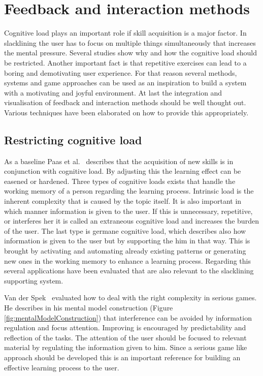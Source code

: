 \section{Feedback and interaction methods}\label{2_4_methods}

Cognitive load plays an important role if skill acquisition is a major factor. In slacklining the user has to focus on multiple things simultaneously that increases the mental pressure. Several studies show why and how the cognitive load should be restricted. Another important fact is that repetitive exercises can lead to a boring and demotivating user experience. For that reason several methods, systems and game approaches can be used as an inspiration to build a system with a motivating and joyful environment. At last the integration and visualisation of feedback and interaction methods should be well thought out. Various techniques have been elaborated on how to provide this appropriately.

\subsection{Restricting cognitive load}

As a baseline Paas et al.~\cite{Paas2003-xt} describes that the acquisition of new skills is in conjunction with cognitive load. By adjusting this the learning effect can be easened or hardened. Three types of cognitive loads exists that handle the working memory of a person regarding the learning process. Intrinsic load is the inherent complexity that is caused by the topic itself. It is also important in which manner information is given to the user. If this is unnecessary, repetitive, or interferes her it is called an extraneous cognitive load and increases the burden of the user. The last type is germane cognitive load, which describes also how information is given to the user but by supporting the him in that way. This is brought by activating and automating already existing patterns or generating new ones in the working memory to enhance a learning process. Regarding this several applications have been evaluated that are also relevant to the slacklining supporting system.

Van der Spek~\cite{Van_der_Spek2010-fe} evaluated how to deal with the right complexity in serious games. He describes in his mental model construction (Figure \ref{fig:mentalModelConstruction}) that interference can be avoided by information regulation and focus attention. Improving is encouraged by predictability and reflection of the tasks. The attention of the user should be focused to relevant material by regulating the information given to him. Since a serious game like approach should be developed this is an important reference for building an effective learning process to the user.

